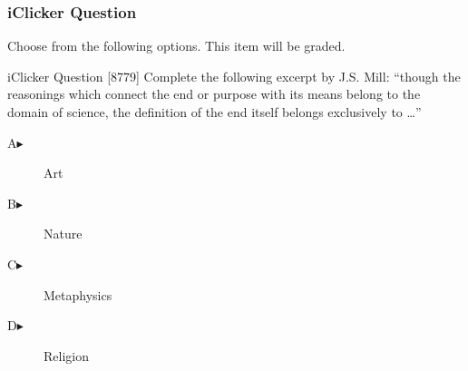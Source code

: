 \begin{frame}
  \frametitle{iClicker Question}
Choose from the following options. This item will be graded.
\begin{block}{iClicker Question}
[8779] Complete the following excerpt by J.S. Mill: ``though the reasonings
which connect the end or purpose with its means belong to the
domain of science, the definition of the end itself belongs
exclusively to {\ldots}''
\end{block}
\begin{description}
\item[A\hspace{.2in}$\blacktriangleright$] Art
\item[B\hspace{.2in}$\blacktriangleright$] Nature
\item[C\hspace{.2in}$\blacktriangleright$] Metaphysics
\item[D\hspace{.2in}$\blacktriangleright$] Religion
\end{description}
\end{frame}
